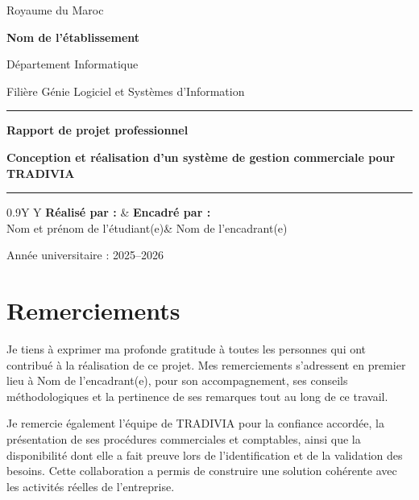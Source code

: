 \documentclass[12pt,a4paper,oneside]{report}
\newcommand{\Etablissement}{Nom de l'établissement}
\newcommand{\Departement}{Département Informatique}
\newcommand{\Filiere}{Filière Génie Logiciel et Systèmes d'Information}
\newcommand{\Auteur}{Nom et prénom de l'étudiant(e)}
\newcommand{\Encadrant}{Nom de l'encadrant(e)}
\newcommand{\AnneeUniversitaire}{2025--2026}
\newcommand{\TitreProjet}{Conception et réalisation d'un système de gestion commerciale pour TRADIVIA}
\begin{document}
\begin{titlepage}
\begin{center}
{\large Royaume du Maroc}\par
\vspace{0.3cm}
{\Large\bfseries \Etablissement}\par
{\large \Departement}\par
{\large \Filiere}\par
\vspace{1.2cm}
\textcolor{tradiviablue}{\rule{\textwidth}{1.2pt}}\par
\vspace{0.6cm}
{\LARGE\bfseries Rapport de projet professionnel}\par
\vspace{0.7cm}
{\Huge\bfseries\color{tradiviablue}\TitreProjet}\par
\vspace{0.5cm}
\textcolor{tradiviagold}{\rule{0.75\textwidth}{2pt}}\par
\vfill
\begin{tabularx}{0.9\textwidth}{Y Y}
\textbf{Réalisé par :} & \textbf{Encadré par :}\\[0.3cm]
\Auteur & \Encadrant\\
\end{tabularx}
\vfill
{\large Année universitaire : \AnneeUniversitaire}
\end{center}
\end{titlepage}

\setcounter{page}{2}

\chapter*{Remerciements}
Je tiens à exprimer ma profonde gratitude à toutes les personnes qui ont contribué à la réalisation de ce projet. Mes remerciements s'adressent en premier lieu à \Encadrant, pour son accompagnement, ses conseils méthodologiques et la pertinence de ses remarques tout au long de ce travail.

Je remercie également l'équipe de TRADIVIA pour la confiance accordée, la présentation de ses procédures commerciales et comptables, ainsi que la disponibilité dont elle a fait preuve lors de l'identification et de la validation des besoins. Cette collaboration a permis de construire une solution cohérente avec les activités réelles de l'entreprise.
\end{document}
